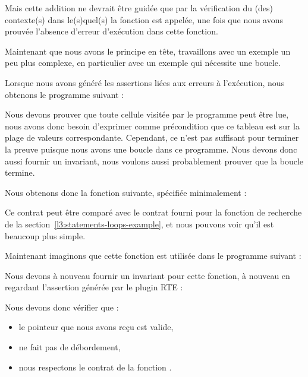 

Mais cette addition ne devrait être guidée que par la vérification du (des)
contexte(s) dans le(s)quel(s) la fonction est appelée, une fois que nous avons
prouvée l'absence d'erreur d'exécution dans cette fonction.




Maintenant que nous avons le principe en tête, travaillons avec un exemple un peu
plus complexe, en particulier avec un exemple qui nécessite une boucle.




Lorsque nous avons généré les assertions liées aux erreurs à l'exécution, nous
obtenons le programme suivant :




Nous devons prouver que toute cellule visitée par le programme peut être lue,
nous avons donc besoin d'exprimer comme précondition que ce tableau est
 sur la plage de valeurs correspondante.
Cependant, ce n'est pas suffisant pour terminer la preuve puisque nous avons une
boucle dans ce programme. Nous devons donc aussi fournir un invariant, nous
voulons aussi probablement prouver que la boucle termine.


Nous obtenons donc la fonction suivante, spécifiée minimalement :





Ce contrat peut être comparé avec le contrat fourni pour la fonction de recherche
de la section~\ref{l3:statements-loops-example}, et nous pouvons voir qu'il est
beaucoup plus simple.


Maintenant imaginons que cette fonction est utilisée dans le programme suivant :




Nous devons à nouveau fournir un invariant pour cette fonction, à nouveau en
regardant l'assertion générée par le plugin RTE :




Nous devons donc vérifier que :

\begin{itemize}
\item le pointeur que nous avons reçu est valide,
\item {} ne fait pas de débordement,
\item nous respectons le contrat de la fonction .
\end{itemize}


